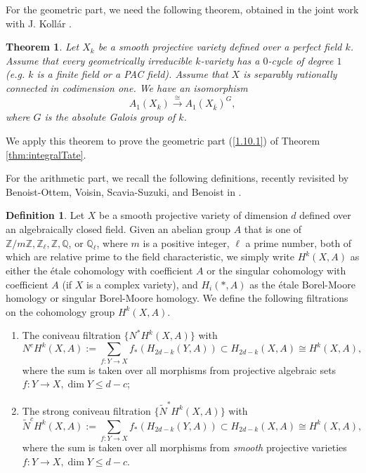 \documentclass{amsart}
\newtheorem{thm}[theorem]{Theorem}
\theoremstyle{definition}
\newtheorem{defn}[theorem]{Definition}
\theoremstyle{remark}
\newcommand{\mbb}{\mathbb}
\newcommand{\QQ}{\mbb{Q}}
\newcommand{\ZZ}{\mbb{Z}}
\begin{document}
For the geometric part, we need the following theorem, obtained in the joint work with J. Koll\'ar \cite{Kollar_Tian}.

\begin{thm}\cite[Theorem 7]{Kollar_Tian}\label{thm:G_inv_cycle}
Let $X_k$ be a smooth projective variety defined over a perfect field $k$. Assume that every geometrically irreducible $k$-variety has a $0$-cycle of degree $1$ (e.g. $k$ is a finite field or a PAC field). Assume that $X$ is separably rationally connected in codimension one.
We have an isomorphism 
\[
A_1(X_k) \xrightarrow{\cong} A_1(X_{\bar{k}})^G,
\]
where $G$ is the absolute Galois group of $k$.  
\end{thm}

We apply this theorem to prove the geometric part (\ref{1.10.1}) of Theorem \ref{thm:integralTate}.

For the arithmetic part, we recall the following definitions,  recently revisited by Benoist-Ottem, Voisin, Scavia-Suzuki, and Benoist in \cite{BO_Coniveau, VoisinConiveau, ScaviaSuzuki_examples, Benoist2022Steenrod}.

\begin{defn}\label{def:filtration_1}
Let $X$ be a smooth projective variety of dimension $d$ defined over an algebraically closed field. 
Given an abelian group $A$ that is one of $\ZZ/m\ZZ, \ZZ_\ell, \ZZ, \QQ$, or $\QQ_\ell$, where $m$ is a positive integer, $\ell$ a prime number, both of which are relative prime to the field characteristic, we simply write $H^k(X, A)$ as either the \'etale cohomology with coefficient $A$ or the singular cohomology with coefficient $A$ (if $X$ is a complex variety), and $H_i(*, A)$ as the \'etale Borel-Moore homology or singular Borel-Moore homology. We define the following filtrations on the  cohomology group $H^k(X, A)$.
\begin{enumerate}
\item The coniveau filtration $\{N^*H^k(X, A)\}$ with
\[
N^cH^k(X, A):=\sum_{f: Y \to X}f_*(H_{2d-k}(Y, A)) \subset H_{2d-k}(X, A)\cong H^k(X, A), 
\]
where the sum is taken over all morphisms from projective algebraic sets $f: Y \to X, \dim Y \leq d-c$;
\item  The strong coniveau filtration $\{\tilde{N}^*H^k(X, A)\}$ with
\[
\tilde{N}^cH^k(X, A):=\sum_{f: Y \to X}f_*(H_{2d-k}(Y, A)) \subset H_{2d-k}(X, A)\cong H^k(X, A),
\]
where the sum is taken over all morphisms from \textit{smooth} projective varieties $f: Y \to X, \dim Y \leq d-c$.
\end{enumerate}
\end{defn}
\end{document}

